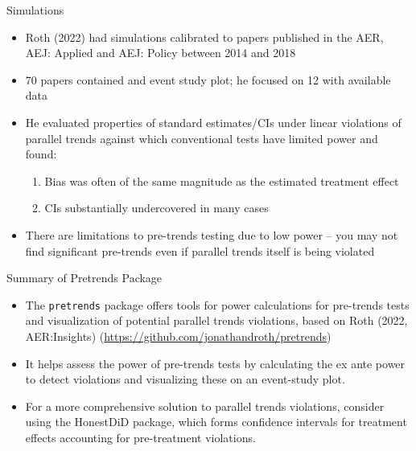 \documentclass{beamer}
\begin{document}
\begin{frame}{Simulations}

\begin{itemize}
\item Roth (2022) had simulations calibrated to papers published in the AER, AEJ: Applied and AEJ: Policy between 2014 and 2018
\item 70 papers contained and event study plot; he focused on 12 with available data
\item He evaluated properties of standard estimates/CIs under linear violations of parallel trends against which conventional tests have limited power and found:
	\begin{enumerate}
	\item Bias was often of the same magnitude as the estimated treatment effect
	\item CIs substantially undercovered in many cases
	\end{enumerate}
\item There are limitations to pre-trends testing due to low power -- you may not find significant pre-trends even if parallel trends itself is being violated
\end{itemize}

\end{frame}

\begin{frame}{Summary of Pretrends Package}
    \begin{itemize}
        \item The \texttt{pretrends} package offers tools for power calculations for pre-trends tests and visualization of potential parallel trends violations, based on Roth (2022, AER:Insights) (\url{https://github.com/jonathandroth/pretrends})
        \item It helps assess the power of pre-trends tests by calculating the ex ante power to detect violations and visualizing these on an event-study plot.
        \item For a more comprehensive solution to parallel trends violations, consider using the HonestDiD package, which forms confidence intervals for treatment effects accounting for pre-treatment violations.
    \end{itemize}
\end{frame}
\end{document}
